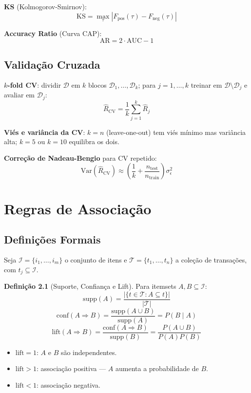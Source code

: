 \documentclass[12pt,a4paper,twoside]{book}
\theoremstyle{definition}
\newtheorem{definicao}{Definição}[chapter]
\theoremstyle{remark}
\newcommand{\Var}{\mathrm{Var}}
\newcommand{\D}{\mathcal{D}}
\newcommand{\abs}[1]{\left|#1\right|}
\begin{document}
\textbf{KS} (Kolmogorov-Smirnov):
\[
\mathrm{KS} = \max_\tau \abs{F_{\text{pos}}(\tau) - F_{\text{neg}}(\tau)}
\]

\textbf{Accuracy Ratio} (Curva CAP):
\[
\mathrm{AR} = 2 \cdot \mathrm{AUC} - 1
\]

\section{Validação Cruzada}

\textbf{$k$-fold CV}: dividir $\D$ em $k$ blocos $\D_1,\ldots,\D_k$; para $j=1,\ldots,k$ treinar em $\D \setminus \D_j$ e avaliar em $\D_j$:
\[
\hat{R}_{\mathrm{CV}} = \frac{1}{k}\sum_{j=1}^k \hat{R}_j
\]

\textbf{Viés e variância da CV}: $k=n$ (leave-one-out) tem viés mínimo mas variância alta; $k=5$ ou $k=10$ equilibra os dois.

\textbf{Correção de Nadeau-Bengio} para CV repetido:
\[
\Var(\hat{R}_{\mathrm{CV}}) \approx \left(\frac{1}{k} + \frac{n_{\text{test}}}{n_{\text{train}}}\right)\sigma^2_\epsilon
\]

\chapter{Regras de Associação}

\section{Definições Formais}

Seja $\mathcal{I} = \{i_1,\ldots,i_m\}$ o conjunto de itens e $\mathcal{T} = \{t_1,\ldots,t_n\}$ a coleção de transações, com $t_j \subseteq \mathcal{I}$.

\begin{definicao}[Suporte, Confiança e Lift]
Para itemsets $A, B \subseteq \mathcal{I}$:
\[
\mathrm{supp}(A) = \frac{|\{t \in \mathcal{T}: A \subseteq t\}|}{|\mathcal{T}|}
\]
\[
\mathrm{conf}(A \Rightarrow B) = \frac{\mathrm{supp}(A \cup B)}{\mathrm{supp}(A)} = P(B \mid A)
\]
\[
\mathrm{lift}(A \Rightarrow B) = \frac{\mathrm{conf}(A \Rightarrow B)}{\mathrm{supp}(B)} = \frac{P(A \cup B)}{P(A)P(B)}
\]
\end{definicao}

\begin{tcolorbox}[defbox,title=Interpretação do Lift]
\begin{itemize}
  \item $\mathrm{lift} = 1$: $A$ e $B$ são independentes.
  \item $\mathrm{lift} > 1$: associação positiva — $A$ aumenta a probabilidade de $B$.
  \item $\mathrm{lift} < 1$: associação negativa.
\end{itemize}
\end{tcolorbox}
\end{document}
